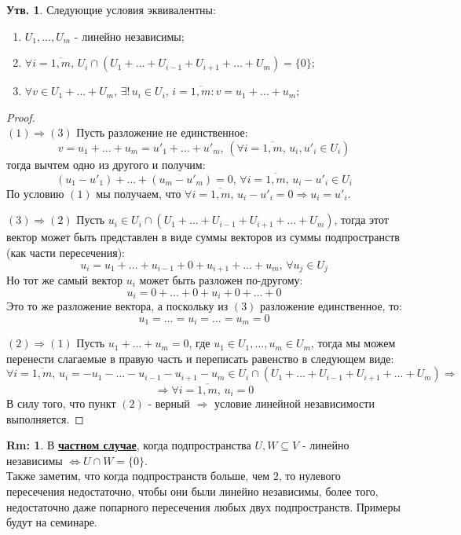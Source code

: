 \documentclass[12pt]{article}
\theoremstyle{definition}
\newtheorem{rem}{Rm:}
\newtheorem{prop}{Утв.}
\begin{document}
\begin{prop}
	Следующие условия эквивалентны:
	\begin{enumerate}[label=(\arabic*)]
		\item $U_1, \dotsc, U_m$ - линейно независимы;
		\item $\forall i = \overline{1,m}, \, U_i \cap \left(U_1 + \dotsc + U_{i-1} + U_{i+1} + \dotsc + U_{m}\right) = \{0\}$;
		\item $\forall v \in U_1 + \dotsc + U_m, \, \exists! \, u_i \in U_i, \, i = \overline{1,m}\colon v = u_1 + \dotsc + u_m$;
	\end{enumerate}
\end{prop}
\begin{proof}\hfill\\
	$(1) \Rightarrow (3)$ Пусть разложение не единственное:
	$$
		v = u_1 + \dotsc + u_m = u'_1 + \dotsc + u'_m, \, (\forall i = \overline{1,m}, \, u_i, u'_i \in U_i)
	$$ 
	тогда вычтем одно из другого и получим:
	$$
		(u_1 - u'_1) + \dotsc + (u_m - u'_m) = 0, \, \forall i = \overline{1,m}, \, u_i - u'_i \in U_i
	$$
	По условию $(1)$ мы получаем, что $\forall i = \overline{1,m}, \, u_i - u'_i = 0 \Rightarrow u_i = u'_i$.
	
	$(3) \Rightarrow (2)$ Пусть $u_i \in  U_i \cap \left(U_1 + \dotsc + U_{i-1} + U_{i+1} + \dotsc + U_{m}\right)$, тогда этот вектор может быть представлен в виде суммы векторов из суммы подпространств (как части пересечения):
	$$
		u_i = u_1 + \dotsc + u_{i-1} + 0 + u_{i+1} + \dotsc + u_m, \, \forall u_j \in U_j
	$$
	Но тот же самый вектор $u_i$ может быть разложен по-другому:
	$$
		u_i = 0 + \dotsc + 0 + u_i + 0 + \dotsc + 0
	$$
	Это то же разложение вектора, а поскольку из $(3)$ разложение единственное, то: 
	$$
		u_1 = \dotsc = u_i = \dotsc = u_m = 0
	$$
	
	$(2) \Rightarrow (1)$ Пусть $u_1 + \dotsc + u_m = 0$, где $u_1 \in U_1, \dotsc, u_m \in U_m$, тогда мы можем перенести слагаемые в правую часть и переписать равенство в следующем виде:
	$$
		\forall i = \overline{1,m}, \, u_i = - u_1 - \dotsc - u_{i-1} - u_{i+1} - u_m \in U_i \cap \left(U_1 + \dotsc + U_{i-1} + U_{i+1} + \dotsc + U_{m}\right) \Rightarrow
	$$
	$$
		\Rightarrow \forall i = \overline{1,m}, \, u_i = 0
	$$
	В силу того, что пункт $(2)$ - верный $\Rightarrow$ условие линейной независимости выполняется.
\end{proof}

\begin{rem}
	В \uline{\textbf{частном случае}}, когда подпространства $U,W \subseteq V$ - линейно независимы $\Leftrightarrow U \cap W = \{0\}$. \\ Также заметим, что когда подпространств больше, чем $2$, то нулевого пересечения недостаточно, чтобы они были линейно независимы, более того, недостаточно даже попарного пересечения любых двух подпространств. Примеры будут на семинаре.
\end{rem}
\end{document}

